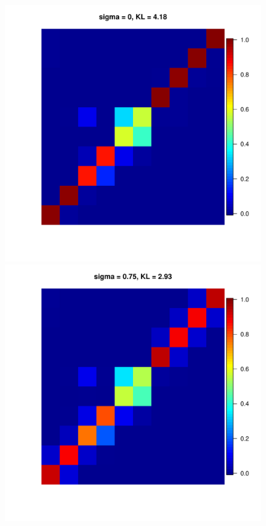 \documentclass[11pt, oneside]{article}   	%
\begin{document}
\begin{figure}[h!]
{\begin{minipage}[t]{.3\textwidth}
	\end{minipage}
	\hfill
	\begin{minipage}[t]{.3\textwidth}
		\centering
		\includegraphics[width=\textwidth]{figures/Pseudo_alpha2N100n100run1sd0.pdf}
		
	\end{minipage} 
	\hfill
	\begin{minipage}[t]{.3\textwidth}
		\centering
		\includegraphics[width=\textwidth]{figures/Pseudo_alpha2N100n100run1sd0dot75.pdf}
		

\end{minipage}}
\end{figure}
\end{document}

